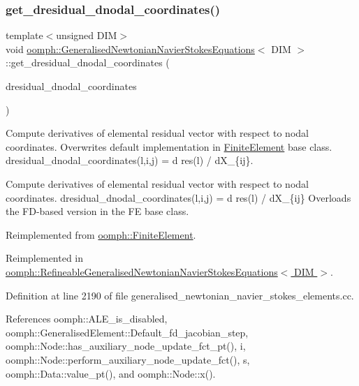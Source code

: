 \subsubsection{\texorpdfstring{get\+\_\+dresidual\+\_\+dnodal\+\_\+coordinates()}{get\_dresidual\_dnodal\_coordinates()}}
{\footnotesize\ttfamily template$<$unsigned D\+IM$>$ \\
void \hyperlink{classoomph_1_1GeneralisedNewtonianNavierStokesEquations}{oomph\+::\+Generalised\+Newtonian\+Navier\+Stokes\+Equations}$<$ D\+IM $>$\+::get\+\_\+dresidual\+\_\+dnodal\+\_\+coordinates (\begin{DoxyParamCaption}\item[{\hyperlink{classoomph_1_1RankThreeTensor}{Rank\+Three\+Tensor}$<$ double $>$ \&}]{dresidual\+\_\+dnodal\+\_\+coordinates }\end{DoxyParamCaption})\hspace{0.3cm}{\ttfamily [virtual]}}



Compute derivatives of elemental residual vector with respect to nodal coordinates. Overwrites default implementation in \hyperlink{classoomph_1_1FiniteElement}{Finite\+Element} base class. dresidual\+\_\+dnodal\+\_\+coordinates(l,i,j) = d res(l) / d\+X\+\_\+\{ij\}. 

Compute derivatives of elemental residual vector with respect to nodal coordinates. dresidual\+\_\+dnodal\+\_\+coordinates(l,i,j) = d res(l) / d\+X\+\_\+\{ij\} Overloads the F\+D-\/based version in the FE base class. 

Reimplemented from \hyperlink{classoomph_1_1FiniteElement_ae4b85a31a983a52d3010930f9e0851b8}{oomph\+::\+Finite\+Element}.



Reimplemented in \hyperlink{classoomph_1_1RefineableGeneralisedNewtonianNavierStokesEquations_a0f5691d4db49d42d411a6ec08d29c45e}{oomph\+::\+Refineable\+Generalised\+Newtonian\+Navier\+Stokes\+Equations$<$ D\+I\+M $>$}.



Definition at line 2190 of file generalised\+\_\+newtonian\+\_\+navier\+\_\+stokes\+\_\+elements.\+cc.



References oomph\+::\+A\+L\+E\+\_\+is\+\_\+disabled, oomph\+::\+Generalised\+Element\+::\+Default\+\_\+fd\+\_\+jacobian\+\_\+step, oomph\+::\+Node\+::has\+\_\+auxiliary\+\_\+node\+\_\+update\+\_\+fct\+\_\+pt(), i, oomph\+::\+Node\+::perform\+\_\+auxiliary\+\_\+node\+\_\+update\+\_\+fct(), s, oomph\+::\+Data\+::value\+\_\+pt(), and oomph\+::\+Node\+::x().



